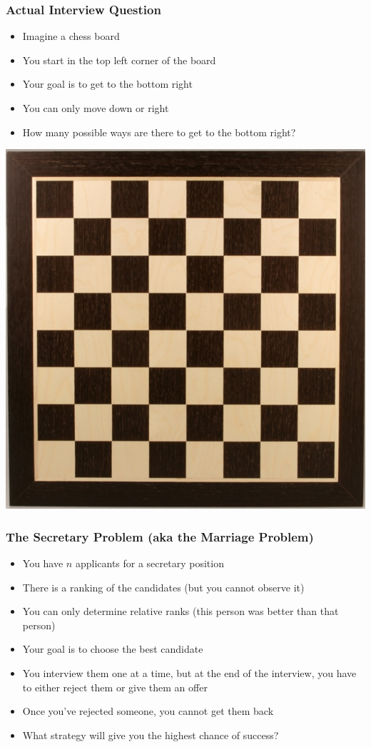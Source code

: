 \documentclass{beamer}
\begin{document}
\begin{frame}
\frametitle{Actual Interview Question}
\begin{itemize}
	\item Imagine a chess board
	\item You start in the top left corner of the board
	\item Your goal is to get to the bottom right
	\item You can only move down or right
	\item How many possible ways are there to get to the bottom right?
\end{itemize}

\centering
\includegraphics[scale=0.25]{./images/chess.jpg}

\end{frame}

\begin{frame}
\frametitle{The Secretary Problem (aka the Marriage Problem)}
\begin{itemize}
	\item You have $n$ applicants for a secretary position
	\item There is a ranking of the candidates (but you cannot observe it)
	\item You can only determine relative ranks (this person was better than that person)
	\item Your goal is to choose the best candidate
	\item You interview them one at a time, but at the end of the interview, you have to either reject them or give them an offer
	\item Once you've rejected someone, you cannot get them back
	\item What strategy will give you the highest chance of success?
\end{itemize}

\end{frame}
\end{document}
